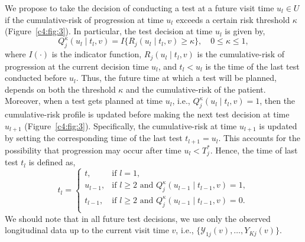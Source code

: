 We propose to take the decision of conducting a test at a future visit time $u_l \in U$ if the cumulative-risk of progression at time $u_l$ exceeds a certain risk threshold $\kappa$ (Figure~\ref{c4:fig:3}). In particular, the test decision at time $u_l$ is given by,
\begin{equation}
\label{c4:eq:personalized_decision_grid}
Q_j^\kappa (u_l \mid t_l, v) = I \big \{ R_j(u_l \mid t_l, v) \geq \kappa \big\}, \quad 0 \leq \kappa \leq 1,
\end{equation}
where $I(\cdot)$ is the indicator function, $R_j(u_l \mid t_l, v)$ is the cumulative-risk of progression at the current decision time $u_l$, and $t_l < u_l$ is the time of the last test conducted before $u_l$. Thus, the future time at which a test will be planned, depends on both the threshold $\kappa$ and the cumulative-risk of the patient. Moreover, when a test gets planned at time $u_l$, i.e., $Q_j^\kappa (u_l \mid t_l, v) = 1$, then the cumulative-risk profile is updated before making the next test decision at time $u_{l+1}$ (Figure~\ref{c4:fig:3}). Specifically, the cumulative-risk at time $u_{l+1}$ is updated by setting the corresponding time of the last test $t_{l+1}=u_l$. This accounts for the possibility that progression may occur after time $u_l < T^*_j$. Hence, the time of last test $t_l$ is defined as,
\begin{equation*}
t_l = \left \{ 
\begin{array}{ll}
t, & \mbox{if } l = 1,\\
u_{l-1}, & \mbox{if } l \geq 2 \mbox{ and } Q_j^\kappa (u_{l-1} \mid t_{l-1}, v) = 1,\\
t_{l-1}, & \mbox{if } l \geq 2 \mbox{ and } Q_j^\kappa (u_{l-1} \mid t_{l-1}, v) = 0.\\
\end{array}
\right.
\end{equation*}
We should note that in all future test decisions, we use only the observed longitudinal data up to the current visit time $v$, i.e., $\{\mathcal Y_{1j}(v), \ldots, Y_{Kj}(v)\}$.
